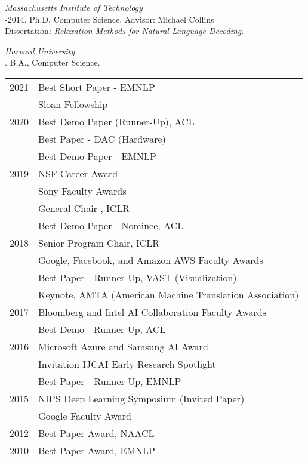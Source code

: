 \documentclass[10pt]{article}
\begin{document}
\noindent\emph{Massachusetts Institute of Technology \vspace{0.01in}}\\
-2014.  Ph.D, Computer Science. Advisor: Michael Collins\\
\ind Dissertation: \emph{Relaxation Methods for Natural Language Decoding}. %



\medskip
\noindent\emph{Harvard University\vspace{0.02in}}\\
. B.A., Computer Science.

\bigskip



\hspace{-1cm} \begin{tabular}{lp{11.5cm}}
2021 & Best Short Paper -  EMNLP \\
     & Sloan Fellowship\\
2020 & Best Demo Paper (Runner-Up), ACL   \\
& Best Paper - DAC (Hardware)  \\
& Best Demo Paper - EMNLP  \\
2019 & NSF Career Award \\
& Sony Faculty Awards \\
     & General Chair , ICLR \\
& Best Demo Paper - Nominee, ACL   \\
2018 & Senior Program Chair, ICLR  \\
& Google, Facebook, and Amazon AWS Faculty Awards \\
& Best Paper - Runner-Up, VAST (Visualization)  \\
& Keynote, AMTA (American Machine Translation Association) \\
2017 & Bloomberg and Intel AI Collaboration Faculty Awards \\
& Best Demo  - Runner-Up, ACL  \\
2016 & Microsoft Azure  and Samsung AI Award \\
 & Invitation IJCAI Early Research Spotlight \\
& Best Paper - Runner-Up, EMNLP \\
2015 & NIPS Deep Learning Symposium (Invited Paper)   \\
 & Google Faculty Award \\
2012 & Best Paper Award, NAACL \\
2010 & Best Paper Award, EMNLP \\
\end{tabular}
\pagebreak
\bigskip
\end{document}
